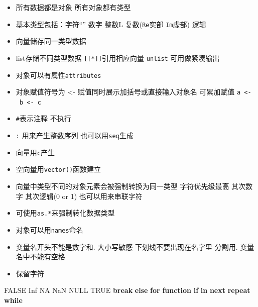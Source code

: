 \documentclass[]{book}
\newenvironment{Shaded}{\begin{snugshade}}{\end{snugshade}}
\newcommand{\ControlFlowTok}[1]{\textcolor[rgb]{0.13,0.29,0.53}{\textbf{#1}}}
\newcommand{\OtherTok}[1]{\textcolor[rgb]{0.56,0.35,0.01}{#1}}
\providecommand{\tightlist}{%
  \setlength{\itemsep}{0pt}\setlength{\parskip}{0pt}}
\begin{document}
\begin{itemize}
\tightlist
\item
  所有数据都是对象 所有对象都有类型
\item
  基本类型包括：字符``'' 数字 整数L 复数(\texttt{Re}实部 \texttt{Im}虚部) 逻辑
\item
  向量储存同一类型数据
\item
  list存储不同类型数据 \texttt{{[}{[}*{]}{]}}引用相应向量 \texttt{unlist} 可用做紧凑输出
\item
  对象可以有属性\texttt{attributes}
\item
  对象赋值符号为 \textless{}- 赋值同时展示加括号或直接输入对象名 可累加赋值 \texttt{a\ \textless{}-\ b\ \textless{}-\ c}
\item
  \texttt{\#}表示注释 不执行
\item
  \texttt{:} 用来产生整数序列 也可以用\texttt{seq}生成
\item
  向量用\texttt{c}产生
\item
  空向量用\texttt{vector()}函数建立
\item
  向量中类型不同的对象元素会被强制转换为同一类型 字符优先级最高 其次数字 其次逻辑(0 or 1) 也可以用来串联字符
\item
  可使用\texttt{as.*}来强制转化数据类型
\item
  对象可以用\texttt{names}命名
\item
  变量名开头不能是数字和. 大小写敏感 下划线不要出现在名字里 分割用. 变量名中不能有空格
\item
  保留字符
\end{itemize}

\begin{Shaded}
\begin{Highlighting}[]
\OtherTok{FALSE} \OtherTok{Inf} \OtherTok{NA} \OtherTok{NaN} \OtherTok{NULL} \OtherTok{TRUE} \ControlFlowTok{break} \ControlFlowTok{else} \ControlFlowTok{for} \ControlFlowTok{function} \ControlFlowTok{if} \ControlFlowTok{in} \ControlFlowTok{next} \ControlFlowTok{repeat} \ControlFlowTok{while}
\end{Highlighting}
\end{Shaded}
\end{document}
